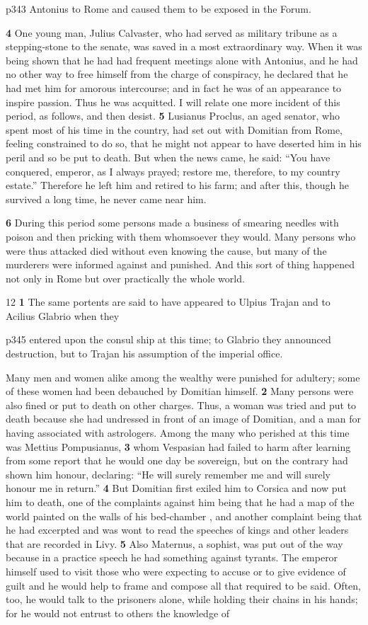 p343 Antonius to Rome and caused them to be exposed in the Forum.

\textbf{4} One young man, Julius Calvaster, who had served as military tribune as a stepping-stone to the senate, was saved in a most extraordinary way. When it was being shown that he had had frequent meetings alone with Antonius, and he had no other way to free himself from the charge of conspiracy, he declared that he had met him for amorous intercourse; and in fact he was of an appearance to inspire passion. Thus he was acquitted. I will relate one more incident of this period, as follows, and then desist. \textbf{5} Lusianus Proclus, an aged senator, who spent most of his time in the country, had set out with Domitian from Rome, feeling constrained to do so, that he might not appear to have deserted him in his peril and so be put to death. But when the news came, he said: ``You have conquered, emperor, as I always prayed; restore me, therefore, to my country estate.'' Therefore he left him and retired to his farm; and after this, though he survived a long time, he never came near him.

\textbf{6} During this period some persons made a business of smearing needles with poison and then pricking with them whomsoever they would. Many persons who were thus attacked died without even knowing the cause, but many of the murderers were informed against and punished. And this sort of thing happened not only in Rome but over practically the whole world.

12
\textbf{1} The same portents are said to have appeared to Ulpius Trajan and to Acilius Glabrio when they

p345 entered upon the consul ­ship at this time; to Glabrio they announced destruction, but to Trajan his assumption of the imperial office.

Many men and women alike among the wealthy were punished for adultery; some of these women had been debauched by Domitian himself. \textbf{2} Many persons were also fined or put to death on other charges. Thus, a woman was tried and put to death because she had undressed in front of an image of Domitian, and a man for having associated with astrologers. Among the many who perished at this time was Mettius Pompusianus, \textbf{3} whom Vespasian had failed to harm after learning from some report that he would one day be sovereign, but on the contrary had shown him honour, declaring: ``He will surely remember me and will surely honour me in return.'' \textbf{4} But Domitian first exiled him to Corsica and now put him to death, one of the complaints against him being that he had a map of the world painted on the walls of his bed-chamber , and another complaint being that he had excerpted and was wont to read the speeches of kings and other leaders that are recorded in Livy. \textbf{5} Also Maternus, a sophist, was put out of the way because in a practice speech he had something against tyrants. The emperor himself used to visit those who were expecting to accuse or to give evidence of guilt and he would help to frame and compose all that required to be said. Often, too, he would talk to the prisoners alone, while holding their chains in his hands; for he would not entrust to others the knowledge of

